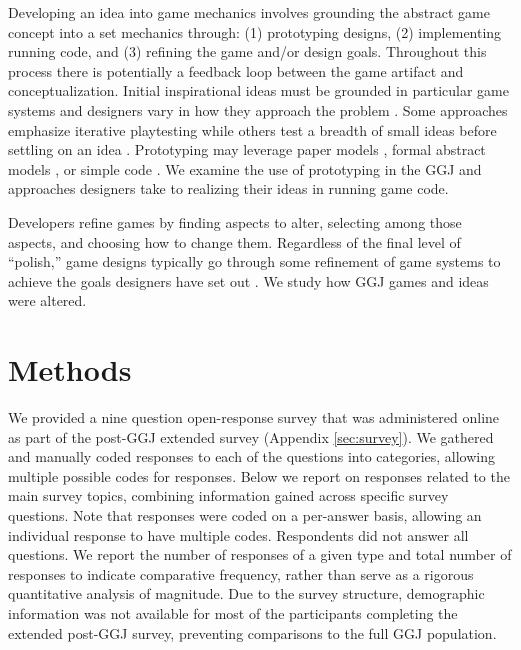 \documentclass{sig-alternate}
\begin{document}
Developing an idea into game mechanics involves grounding the abstract game concept into a set mechanics through: (1) prototyping designs, (2) implementing running code, and (3) refining the game and/or design goals. Throughout this process there is potentially a feedback loop between the game artifact and conceptualization. Initial inspirational ideas must be grounded in particular game systems and designers vary in how they approach the problem \cite{gabler2005:7day-prototype,manker2011:prototyping,nelson2009:reqanal}. Some approaches emphasize iterative playtesting \cite{fullerton2008:playcentric,schell2008:gamedesign} while others test a breadth of small ideas before settling on an idea \cite{gabler2005:7day-prototype}. Prototyping may leverage paper models \cite{manker2011:prototyping}, formal abstract models \cite{dormans2011:machinations2,nelson2009:reqanal}, or simple code \cite{gabler2005:7day-prototype}. We examine the use of prototyping in the GGJ and approaches designers take to realizing their ideas in running game code.

Developers refine games by finding aspects to alter, selecting among those aspects, and choosing how to change them. Regardless of the final level of ``polish,'' game designs typically go through some refinement of game systems to achieve the goals designers have set out \cite{fullerton2008:playcentric,schell2008:gamedesign}. We study how GGJ games and ideas were altered.


\section{Methods}
We provided a nine question open-response survey that was administered online as part of the post-GGJ extended survey (Appendix \ref{sec:survey}). We gathered and manually coded responses to each of the questions into categories, allowing multiple possible codes for responses. Below we report on responses related to the main survey topics, combining information gained across specific survey questions. Note that responses were coded on a per-answer basis, allowing an individual response to have multiple codes. Respondents did not answer all questions. We report the number of responses of a given type and total number of responses to indicate comparative frequency, rather than serve as a rigorous quantitative analysis of magnitude. Due to the survey structure, demographic information was not available for most of the participants completing the extended post-GGJ survey, preventing comparisons to the full GGJ population.
\end{document}
